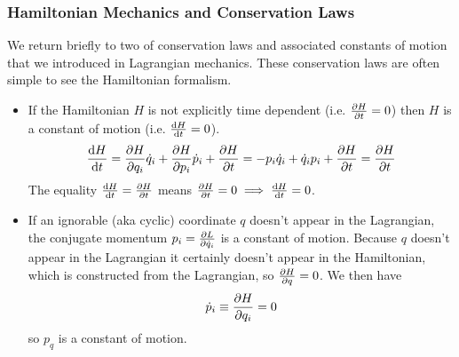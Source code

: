 \documentclass[11pt, a4paper]{article}
\begin{document}
\subsubsection{Hamiltonian Mechanics and Conservation Laws}
We return briefly to two of conservation laws and associated constants of motion that we introduced in Lagrangian mechanics. These conservation laws are often simple to see the Hamiltonian formalism.
\begin{itemize}
	\item If the Hamiltonian $ H $ is not explicitly time dependent (i.e. $ \pdv{H}{t} = 0 $) then $ H $ is a constant of motion (i.e. $ \dv{H}{t} = 0 $).
	\begin{align*}
		\dv{H}{t} = \pdv{H}{q_{i}} \dot{q}_{i} + \pdv{H}{p_{i}} \dot{p}_{i} + \pdv{H}{t} = -p_{i} \dot{q}_{i} + \dot{q}_{i} p_{i} + \pdv{H}{t} = \pdv{H}{t} 
	\end{align*}
	The equality $ \dv{H}{t} = \pdv{H}{t} $ means $ \pdv{H}{t} = 0 \implies  \dv{H}{t} = 0 $. 
	
	\item If an ignorable (aka cyclic) coordinate $ q $ doesn't appear in the Lagrangian, the conjugate momentum $ p_{i} = \pdv{L}{\dot{q}_{i}} $ is a constant of motion. Because $ q $ doesn't appear in the Lagrangian it certainly doesn't appear in the Hamiltonian, which is constructed from the Lagrangian, so $ \pdv{H}{q} = 0 $. We then have
	\begin{equation*}
		\dot{p}_{i} \equiv \pdv{H}{q_{i}} = 0
	\end{equation*}
	so $ p_{q} $ is a constant of motion.
\end{itemize}
\end{document}
